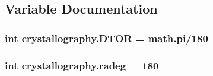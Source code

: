 \subsection{Variable Documentation}
\hypertarget{namespacecrystallography_ad28d74622030c2011af7636d2657ed99}{
\subsubsection[{D\-T\-O\-R}]{\setlength{\rightskip}{0pt plus 5cm}int crystallography.\-D\-T\-O\-R = math.\-pi/180}}\label{namespacecrystallography_ad28d74622030c2011af7636d2657ed99}
\hypertarget{namespacecrystallography_ad0848788e86c4a194771f24fb582c3c8}{
\subsubsection[{radeg}]{\setlength{\rightskip}{0pt plus 5cm}int crystallography.\-radeg = 180}}\label{namespacecrystallography_ad0848788e86c4a194771f24fb582c3c8}
